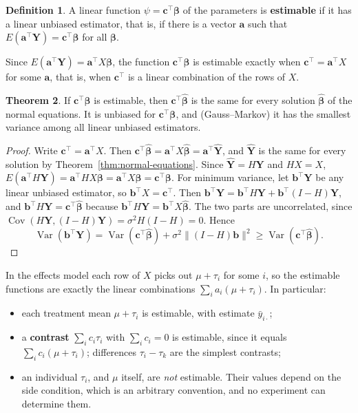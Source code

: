 \documentclass[11pt,a4paper]{article}
\numberwithin{equation}{section}
\DeclareMathOperator{\Var}{Var}
\DeclareMathOperator{\Cov}{Cov}
\theoremstyle{definition}
\newtheorem{thm}{Theorem}[subsection]
\newtheorem{defn}[thm]{Definition}
\begin{document}
\begin{defn}
A linear function $\psi = \mathbf c^\top\boldsymbol\beta$ of the parameters is \textbf{estimable} if it has a linear unbiased estimator, that is, if there is a vector $\mathbf a$ such
that $E(\mathbf a^\top\mathbf Y) = \mathbf c^\top\boldsymbol\beta$ for all $\boldsymbol\beta$.
\end{defn}

Since $E(\mathbf a^\top\mathbf Y) = \mathbf a^\top X\boldsymbol\beta$, the function $\mathbf c^\top\boldsymbol\beta$ is estimable exactly when $\mathbf c^\top = \mathbf a^\top X$ for some $\mathbf a$, that is, when $\mathbf c^\top$ is a linear combination
of the rows of $X$.

\begin{thm}\label{thm:estimable}
If $\mathbf c^\top\boldsymbol\beta$ is estimable, then $\mathbf c^\top\hat{\boldsymbol\beta}$ is the same for every solution $\hat{\boldsymbol\beta}$ of the normal equations. It is unbiased for $\mathbf c^\top\boldsymbol\beta$, and (Gauss--Markov) it has
the smallest variance among all linear unbiased estimators.
\end{thm}

\begin{proof}
Write $\mathbf c^\top = \mathbf a^\top X$. Then $\mathbf c^\top\hat{\boldsymbol\beta} = \mathbf a^\top X\hat{\boldsymbol\beta} = \mathbf a^\top\hat{\mathbf Y}$, and $\hat{\mathbf Y}$ is the same for every solution by Theorem~\ref{thm:normal-equations}.
Since $\hat{\mathbf Y} = H\mathbf Y$ and $HX = X$, $E(\mathbf a^\top H\mathbf Y) = \mathbf a^\top HX\boldsymbol\beta = \mathbf a^\top X\boldsymbol\beta = \mathbf c^\top\boldsymbol\beta$. For minimum variance, let $\mathbf b^\top\mathbf Y$ be any linear unbiased
estimator, so $\mathbf b^\top X = \mathbf c^\top$. Then $\mathbf b^\top\mathbf Y = \mathbf b^\top H\mathbf Y + \mathbf b^\top(I - H)\mathbf Y$, and $\mathbf b^\top H\mathbf Y = \mathbf c^\top\hat{\boldsymbol\beta}$ because $\mathbf b^\top H\mathbf Y = \mathbf b^\top X\hat{\boldsymbol\beta}$. The two parts are
uncorrelated, since $\Cov(H\mathbf Y, (I - H)\mathbf Y) = \sigma^2H(I - H) = 0$. Hence
\[
\Var(\mathbf b^\top\mathbf Y) = \Var(\mathbf c^\top\hat{\boldsymbol\beta}) + \sigma^2\|(I - H)\mathbf b\|^2 \ge \Var(\mathbf c^\top\hat{\boldsymbol\beta}) .
\]
\end{proof}

In the effects model each row of $X$ picks out $\mu + \tau_i$ for some $i$, so the estimable functions are exactly the linear combinations
$\sum_ia_i(\mu + \tau_i)$. In particular:
\begin{itemize}
\item each treatment mean $\mu + \tau_i$ is estimable, with estimate $\bar y_{i\cdot}$;
\item a \textbf{contrast} $\sum_ic_i\tau_i$ with $\sum_ic_i = 0$ is estimable, since it equals $\sum_ic_i(\mu + \tau_i)$; differences $\tau_i - \tau_k$ are the simplest contrasts;
\item an individual $\tau_i$, and $\mu$ itself, are \emph{not} estimable. Their values depend on the side condition, which is an arbitrary convention, and
no experiment can determine them.
\end{itemize}
\end{document}
